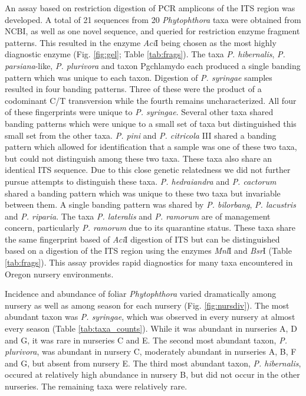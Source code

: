 \documentclass[12pt]{article}
\begin{document}
An assay based on restriction digestion of PCR amplicons of the ITS region was developed.  A total of 21 sequences from 20 \emph{Phytophthora} taxa were obtained from NCBI, as well as one novel sequence, and queried for restriction enzyme fragment patterns.  This resulted in the enzyme \emph{Aci}I being chosen as the most highly diagnostic enzyme (Fig. \ref{fig:gel}; Table \ref{tab:frags}).  The taxa \emph{P. hibernalis}, \emph{P. parsiana}-like, \emph{P. plurivora} and taxon Pgchlamydo each produced a single banding pattern which was unique to each taxon.  Digestion of \emph{P. syringae} samples resulted in four banding patterns.  Three of these were the product of a codominant C/T transversion while the fourth remains uncharacterized.  All four of these fingerprints were unique to \emph{P. syringae}.  Several other taxa shared banding patterns which were unique to a small set of taxa but distinguished this small set from the other taxa.  \emph{P. pini} and \emph{P. citricola} III shared a banding pattern which allowed for identification that a sample was one of these two taxa, but could not distinguish among these two taxa.  These taxa also share an identical ITS sequence.  Due to this close genetic relatedness we did not further pursue attempts to distinguish these taxa.  \emph{P. hedraiandra} and \emph{P. cactorum} shared a banding pattern which was unique to these two taxa but invariable between them.  A single banding pattern was shared by \emph{P. bilorbang}, \emph{P. lacustris} and \emph{P. riparia}.  The taxa \emph{P. lateralis} and \emph{P. ramorum} are of management concern, particularly \emph{P. ramorum} due to its quarantine status.  These taxa share the same fingerprint based of \emph{Aci}I digestion of ITS but can be distinguished based on a digestion of the ITS region using the enzymes \emph{Mnl}I and \emph{Bsr}I (Table \ref{tab:frags}).  This assay provides rapid diagnostics for many taxa encountered in Oregon nursery environments.




Incidence and abundance of foliar \emph{Phytophthora} varied dramatically among nursery as well as among season for each nursery (Fig. \ref{fig:nursdiv}).  The most abundant taxon was \emph{P. syringae}, which was observed in every nursery at almost every season (Table \ref{tab:taxa_counts}).  While it was abundant in nurseries A, D and G, it was rare in nurseries C and E.  The second most abundant taxon, \emph{P. plurivora}, was abundant in nursery C, moderately abundant in nurseries A, B, F and G, but absent from nursery E.  The third most abundant taxon, \emph{P. hibernalis}, occured at relatively high abundance in nursery B, but did not occur in the other nurseries.  The remaining taxa were relatively rare.
\end{document}
